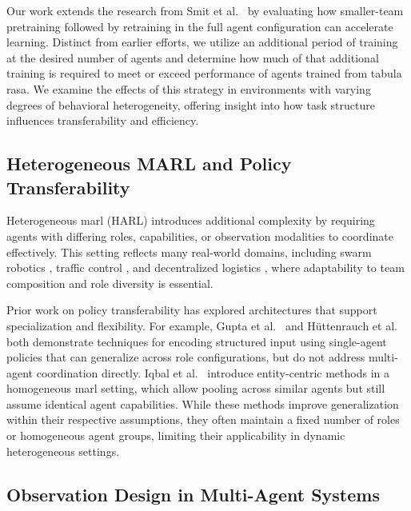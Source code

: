 Our work extends the research from Smit et al.~\cite{smit2023}
by evaluating how smaller-team pretraining followed 
by retraining in the full agent configuration can accelerate learning. 
Distinct from earlier efforts, we utilize an additional period of training at 
the desired number of agents and determine how much of that additional training 
is required to meet or exceed performance of agents trained from tabula rasa.
We examine the effects of this strategy in environments with varying degrees of 
behavioral heterogeneity, offering insight into how task structure influences 
transferability and efficiency.

\subsection{Heterogeneous MARL and Policy Transferability}

Heterogeneous \gls{marl} (HARL) introduces additional complexity by requiring agents with 
differing roles, capabilities, or observation modalities to coordinate effectively. 
This setting reflects many real-world domains, including swarm robotics \cite{hoang2023}, 
traffic control \cite{calvo2018}, and decentralized logistics \cite{rizk2019}, 
where adaptability to team composition and role diversity is essential.

Prior work on policy transferability has explored architectures that support specialization 
and flexibility. For example, Gupta et al.~\cite{gupta2017a} and H{\"u}ttenrauch 
et al.~\cite{huttenrauch2019} both demonstrate techniques for encoding structured input 
using single-agent policies that can generalize across role configurations, but do not 
address multi-agent coordination directly. Iqbal et al.~\cite{iqbal2021} introduce 
entity-centric methods in a homogeneous \gls{marl} setting, which allow pooling across similar 
agents but still assume identical agent capabilities. While these methods improve 
generalization within their respective assumptions, they often maintain a fixed number of roles 
or homogeneous agent groups, limiting their applicability in dynamic heterogeneous settings.


\subsection{Observation Design in Multi-Agent Systems}
\label{con1:sec:related_work-observation_design}

